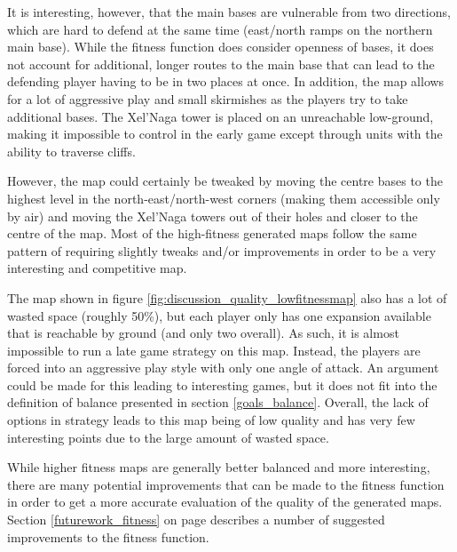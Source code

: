 It is interesting, however, that the main bases are vulnerable from two directions, which are hard to defend at the same time (east/north ramps on the northern main base). While the fitness function does consider openness of bases, it does not account for additional, longer routes to the main base that can lead to the defending player having to be in two places at once. In addition, the map allows for a lot of aggressive play and small skirmishes as the players try to take additional bases. The Xel'Naga tower is placed on an unreachable low-ground, making it impossible to control in the early game except through units with the ability to traverse cliffs.

However, the map could certainly be tweaked by moving the centre bases to the highest level in the north-east/north-west corners (making them accessible only by air) and moving the Xel'Naga towers out of their holes and closer to the centre of the map. Most of the high-fitness generated maps follow the same pattern of requiring slightly tweaks and/or improvements in order to be a very interesting and competitive map.


The map shown in figure \ref{fig:discussion_quality_lowfitnessmap} also has a lot of wasted space (roughly 50\%), but each player only has one expansion available that is reachable by ground (and only two overall). As such, it is almost impossible to run a late game strategy on this map. Instead, the players are forced into an aggressive play style with only one angle of attack. An argument could be made for this leading to interesting games, but it does not fit into the definition of balance presented in section \ref{goals_balance}. Overall, the lack of options in strategy leads to this map being of low quality and has very few interesting points due to the large amount of wasted space.


While higher fitness maps are generally better balanced and more interesting, there are many potential improvements that can be made to the fitness function in order to get a more accurate evaluation of the quality of the generated maps. Section \ref{futurework_fitness} on page \pageref{futurework_fitness} describes a number of suggested improvements to the fitness function.

